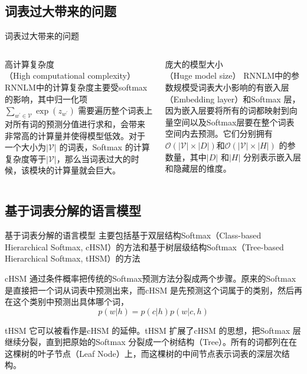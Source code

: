 \documentclass[14pt]{Bredelebeamer}
\begin{document}
\subsection{词表过大带来的问题}
\begin{frame}{词表过大带来的问题}
    \begin{columns}
    \begin{column}{.5\textwidth}
        \begin{block}{高计算复杂度\\（High computational complexity）}
        RNNLM中的计算复杂度主要受softmax的影响，其中归一化项${\sum_{w^{'}\in\mathcal{V}} {\exp(z_{w^{'}})}}$ 需要遍历整个词表上对所有词的预测分值进行求和，会带来非常高的计算量并使得模型低效。对于一个大小为${|\mathcal{V}|}$ 的词表，Softmax 的计算复杂度等于${\mathcal{|\mathcal{V}|}}$，那么当词表过大的时候，该模块的计算量就会巨大。

        \end{block}
    \end{column}
    \begin{column}{0.5\textwidth}
        \begin{block}{庞大的模型大小\\（Huge model size）}
        RNNLM中的参数规模受词表大小影响的有嵌入层（Embedding layer）和Softmax 层，因为嵌入层要将所有的词都映射到向量空间以及Softmax层要在整个词表空间内去预测。它们分别拥有${\mathcal{O}(|\mathcal{V}| \times |D|)}$和${\mathcal{O}(|\mathcal{V}| \times |H|)}$ 的参数量，其中$|D|$ 和$|H|$ 分别表示嵌入层和隐藏层的维度。

        \end{block}
    \end{column}
    \end{columns}
\end{frame}

\subsection{基于词表分解的语言模型}

\begin{frame}{基于词表分解的语言模型}
    主要包括基于双层结构Softmax（Class-based Hierarchical Softmax, cHSM）的方法和基于树层级结构Softmax（Tree-based Hierarchical Softmax, tHSM）的方法
    \pause
    \begin{block}{cHSM}
    通过条件概率把传统的Softmax预测方法分裂成两个步骤。原来的Softmax 是直接把一个词从词表中预测出来，而cHSM 是先预测这个词属于的类别，然后再在这个类别中预测出具体哪个词，
    \begin{equation}
    \label{eq:cHSM}
	p(w|h)=p(c|h)p(w|c,h)
    \end{equation}

    \end{block}
    \pause
    \begin{block}{tHSM}
    它可以被看作是cHSM 的延伸。tHSM 扩展了cHSM 的思想，把Softmax 层继续分裂，直到把原始的Softmax 分裂成一个树结构（Tree）。所有的词都列在在这棵树的叶子节点（Leaf Node）上，而这棵树的中间节点表示词表的深层次结构。
    \end{block}
\end{frame}
\end{document}
